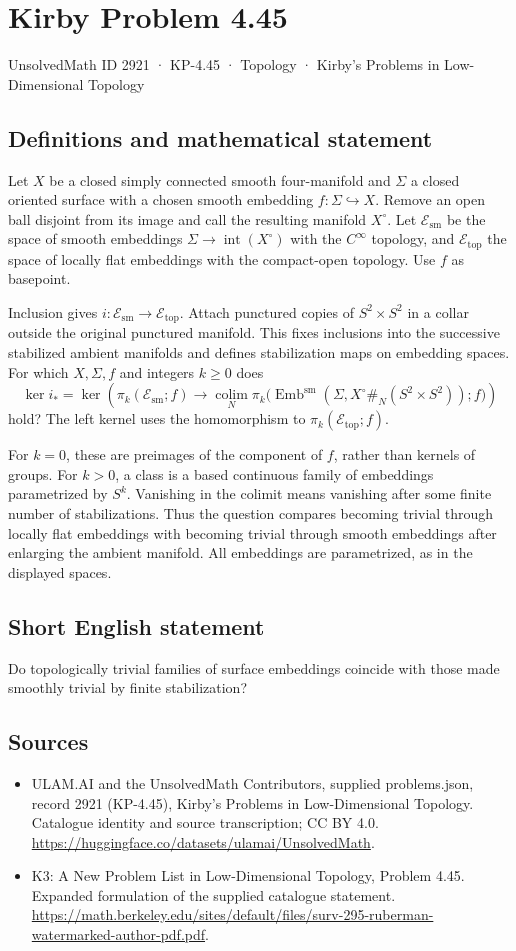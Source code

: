 \documentclass[11pt,a4paper]{article}
\begin{document}
\section*{Kirby Problem 4.45}\label{2921}
{\small UnsolvedMath ID 2921 · KP-4.45 · Topology · Kirby's Problems in Low-Dimensional Topology}
\subsection{Definitions and mathematical statement}
Let $X$ be a closed simply connected smooth four-manifold and $\Sigma$ a closed oriented surface with a chosen smooth embedding $f:\Sigma\hookrightarrow X$. Remove an open ball disjoint from its image and call the resulting manifold $X^\circ$. Let $\mathcal E_{\mathrm{sm}}$ be the space of smooth embeddings $\Sigma\to\operatorname{int}(X^\circ)$ with the $C^\infty$ topology, and $\mathcal E_{\mathrm{top}}$ the space of locally flat embeddings with the compact-open topology. Use $f$ as basepoint.

Inclusion gives $i:\mathcal E_{\mathrm{sm}}\to\mathcal E_{\mathrm{top}}$. Attach punctured copies of $S^2\times S^2$ in a collar outside the original punctured manifold. This fixes inclusions into the successive stabilized ambient manifolds and defines stabilization maps on embedding spaces. For which $X,\Sigma,f$ and integers $k\ge0$ does
\[
\ker i_* = \ker\left(
\pi_k(\mathcal E_{\mathrm{sm}};f)\longrightarrow
\operatorname*{colim}_{N}\pi_k\bigl(
\operatorname{Emb}^{\mathrm{sm}}(\Sigma,X^\circ\#_N(S^2\times S^2));f\bigr)\right)
\]
hold? The left kernel uses the homomorphism to $\pi_k(\mathcal E_{\mathrm{top}};f)$.

For $k=0$, these are preimages of the component of $f$, rather than kernels of groups. For $k>0$, a class is a based continuous family of embeddings parametrized by $S^k$. Vanishing in the colimit means vanishing after some finite number of stabilizations. Thus the question compares becoming trivial through locally flat embeddings with becoming trivial through smooth embeddings after enlarging the ambient manifold. All embeddings are parametrized, as in the displayed spaces.
\subsection{Short English statement}
Do topologically trivial families of surface embeddings coincide with those made smoothly trivial by finite stabilization?
\subsection{Sources}
\begin{itemize}
\item[S1] ULAM.AI and the UnsolvedMath Contributors, supplied problems.json, record 2921 (KP-4.45), Kirby's Problems in Low-Dimensional Topology. Catalogue identity and source transcription; CC BY 4.0.
\url{https://huggingface.co/datasets/ulamai/UnsolvedMath}.
\item[S2] K3: A New Problem List in Low-Dimensional Topology, Problem 4.45. Expanded formulation of the supplied catalogue statement.
\url{https://math.berkeley.edu/sites/default/files/surv-295-ruberman-watermarked-author-pdf.pdf}.
\end{itemize}
\end{document}
